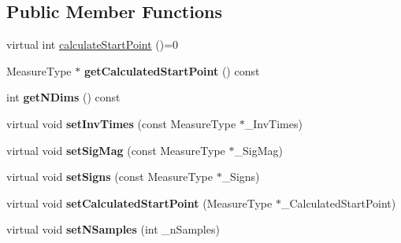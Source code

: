 \subsection*{Public Member Functions}
\begin{DoxyCompactItemize}
\item 
virtual int \hyperlink{class_ox_1_1_start_point_calculator_a9d1132410d68eb16f3f71ec4015c0b2f}{calculate\-Start\-Point} ()=0
\item 
\hypertarget{class_ox_1_1_start_point_calculator_a48b39c1d6bb733821f7297593e424728}{Measure\-Type $\ast$ {\bfseries get\-Calculated\-Start\-Point} () const }\label{class_ox_1_1_start_point_calculator_a48b39c1d6bb733821f7297593e424728}

\item 
\hypertarget{class_ox_1_1_start_point_calculator_a75c73487e21a0f4920762c1efc96d573}{int {\bfseries get\-N\-Dims} () const }\label{class_ox_1_1_start_point_calculator_a75c73487e21a0f4920762c1efc96d573}

\item 
\hypertarget{class_ox_1_1_start_point_calculator_a0632bd0dcf7707930058d63e2176fc7a}{virtual void {\bfseries set\-Inv\-Times} (const Measure\-Type $\ast$\-\_\-\-Inv\-Times)}\label{class_ox_1_1_start_point_calculator_a0632bd0dcf7707930058d63e2176fc7a}

\item 
\hypertarget{class_ox_1_1_start_point_calculator_a7cff5323e92bc00fdc9baa2a3eef7a37}{virtual void {\bfseries set\-Sig\-Mag} (const Measure\-Type $\ast$\-\_\-\-Sig\-Mag)}\label{class_ox_1_1_start_point_calculator_a7cff5323e92bc00fdc9baa2a3eef7a37}

\item 
\hypertarget{class_ox_1_1_start_point_calculator_a1245375d6cad369f18ab4a32ddb28446}{virtual void {\bfseries set\-Signs} (const Measure\-Type $\ast$\-\_\-\-Signs)}\label{class_ox_1_1_start_point_calculator_a1245375d6cad369f18ab4a32ddb28446}

\item 
\hypertarget{class_ox_1_1_start_point_calculator_aebb0511e802eff920369dec99b6c00fb}{virtual void {\bfseries set\-Calculated\-Start\-Point} (Measure\-Type $\ast$\-\_\-\-Calculated\-Start\-Point)}\label{class_ox_1_1_start_point_calculator_aebb0511e802eff920369dec99b6c00fb}

\item 
\hypertarget{class_ox_1_1_start_point_calculator_a72195ac7840734cd9001d0303ab859f4}{virtual void {\bfseries set\-N\-Samples} (int \-\_\-n\-Samples)}\label{class_ox_1_1_start_point_calculator_a72195ac7840734cd9001d0303ab859f4}


\end{DoxyCompactItemize}
